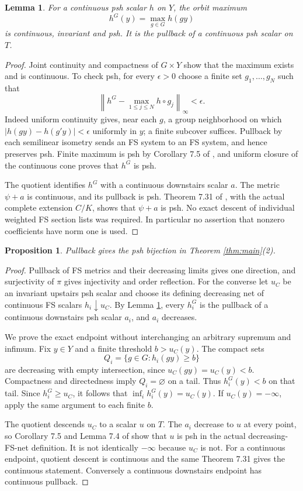 \documentclass[11pt]{article}
\newtheorem{lemma}[theorem]{Lemma}
\newtheorem{proposition}[theorem]{Proposition}
\theoremstyle{remark}
\begin{document}
\begin{lemma}\label{lem:orbit}
For a continuous psh scalar $h$ on $Y$, the orbit maximum
\[
 h^G(y)=\max_{g\in G}h(gy)
\]
is continuous, invariant and psh. It is the pullback of a continuous
psh scalar on $T$.
\end{lemma}
\begin{proof}
Joint continuity and compactness of $G\times Y$ show that the maximum
exists and is continuous. To check psh, for every $\epsilon>0$ choose
a finite set $g_1,\ldots,g_N$ such that
\[
 \left\|h^G-\max_{1\leq j\leq N} h\circ g_j\right\|_\infty
 <\epsilon.
\]
Indeed uniform continuity gives, near each $g$, a group neighborhood
on which $|h(gy)-h(g'y)|<\epsilon$ uniformly in $y$; a finite
subcover suffices. Pullback by each semilinear isometry sends an FS
system to an FS system, and hence preserves psh. Finite maximum is
psh by Corollary 7.5 of \cite{BE}, and uniform closure of the
continuous cone proves that $h^G$ is psh.

The quotient identifies $h^G$ with a continuous downstairs scalar
$a$. The metric $\psi+a$ is continuous, and its pullback is psh.
Theorem 7.31 of \cite{BE}, with the actual complete extension $C/K$,
shows that $\psi+a$ is psh. No exact descent of individual weighted
FS section lists was required. In particular no assertion that
nonzero coefficients have norm one is used.
\end{proof}

\begin{proposition}\label{prop:singular}
Pullback gives the psh bijection in Theorem \ref{thm:main}(2).
\end{proposition}
\begin{proof}
Pullback of FS metrics and their decreasing limits gives one
direction, and surjectivity of $\pi$ gives injectivity and order
reflection. For the converse let $u_C$ be an invariant upstairs psh
scalar and choose its defining decreasing net of continuous FS
scalars $h_i\downarrow u_C$. By Lemma \ref{lem:orbit}, every $h_i^G$
is the pullback of a continuous downstairs psh scalar $a_i$, and
$a_i$ decreases.

We prove the exact endpoint without interchanging an arbitrary
supremum and infimum. Fix $y\in Y$ and a finite threshold $b>u_C(y)$.
The compact sets
\[
 Q_i=\{g\in G:h_i(gy)\geq b\}
\]
are decreasing with empty intersection, since $u_C(gy)=u_C(y)<b$.
Compactness and directedness imply $Q_i=\varnothing$ on a tail.
Thus $h_i^G(y)<b$ on that tail. Since $h_i^G\geq u_C$, it follows
that $\inf_i h_i^G(y)=u_C(y)$. If $u_C(y)=-\infty$, apply the same
argument to each finite $b$.

The quotient descends $u_C$ to a scalar $u$ on $T$. The $a_i$
decrease to $u$ at every point, so Corollary 7.5 and Lemma 7.4 of
\cite{BE} show that $u$ is psh in the actual decreasing-FS-net
definition. It is not identically $-\infty$ because $u_C$ is not.
For a continuous endpoint, quotient descent is continuous and the
same Theorem 7.31 gives the continuous statement. Conversely a
continuous downstairs endpoint has continuous pullback.
\end{proof}
\end{document}
